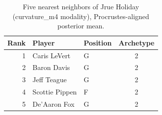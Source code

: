 \begin{table}[htbp]
  \centering\small
  \begin{tabular}{rllc}
    \toprule
    Rank & Player & Position & Archetype \\
    \midrule
    1 & Caris LeVert & G & 2 \\
    2 & Baron Davis & G & 2 \\
    3 & Jeff Teague & G & 2 \\
    4 & Scottie Pippen & F & 2 \\
    5 & De'Aaron Fox & G & 2 \\
    \bottomrule
  \end{tabular}
  \caption{Five nearest neighbors of Jrue Holiday (curvature_m4 modality), Procrustes-aligned posterior mean.}
  \label{tab:Jrue_Holiday_neighbors_curvature_m4}
\end{table}

